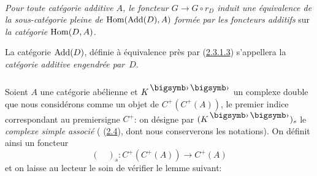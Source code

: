 \documentclass[10pt]{../fichiers-configuration-latex/smfart}
\begin{document}
\paragraph{}
\emph{Pour toute catégorie additive $A$, le foncteur $G \to G \circ r_D$
induit une équivalence de la sous-catégorie pleine de $\operatorname{Hom}(\operatorname{Add}(D),
A)$ formée par les foncteurs additifs} sur \emph{la catégorie $\operatorname{Hom}(D, A)$.}

La catégorie $\operatorname{Add}(D)$, définie à équivalence près par
(\hyperref[Vbis.par2.3.1.3]{2.3.1.3}) s'appellera la \emph{catégorie additive
engendrée par $D$}.



\subsubsection{}
Soient $A$ une catégorie abélienne et $K^{\bigdot\bigdot}$ un complexe
double que nous considérons comme un objet de $C^{+}(C^+(A))$, le
premier indice correspondant au premier\pageoriginale signe $C^+$: on
désigne par $(K^{\bigdot \bigdot})_s$ le \emph{complexe simple associé} (\cf {} (\hyperref[Vbis.subsec2.4]{2.4}),
dont nous conserverons les notations). On définit ainsi un foncteur
\begin{equation*}
(\quad)_s : C^+ (C^+(A))\to C^+(A)\tag{2.3.2.1}
\end{equation*}
et on laisse au lecteur le soin de vérifier le lemme suivant:
\end{document}
